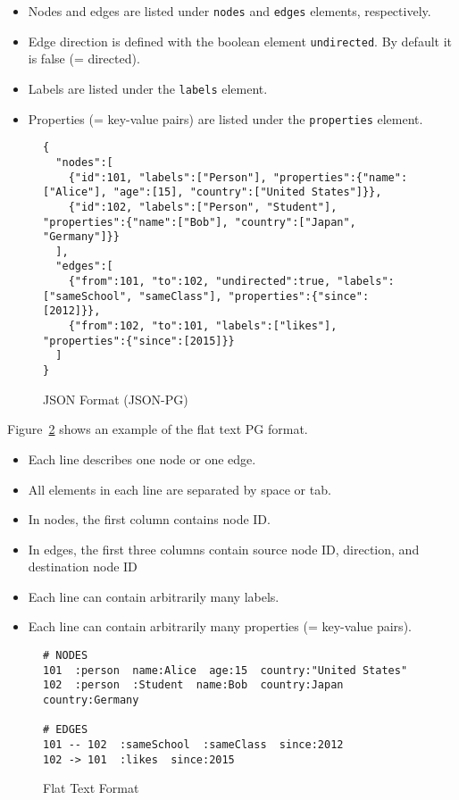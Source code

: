 \documentclass[runningheads]{llncs}
\begin{document}
\begin{itemize}
    \item Nodes and edges are listed under \texttt{nodes} and \texttt{edges} elements, respectively.
    \item Edge direction is defined with the boolean element \texttt{undirected}. By default it is false (= directed).
    \item Labels are listed under the \texttt{labels} element.
    \item Properties (= key-value pairs) are listed under the \texttt{properties} element.
\end{itemize}

\begin{figure}[!t]
\vspace{2mm}
\begin{scriptsize}
\begin{verbatim}
{
  "nodes":[
    {"id":101, "labels":["Person"], "properties":{"name":["Alice"], "age":[15], "country":["United States"]}},
    {"id":102, "labels":["Person", "Student"], "properties":{"name":["Bob"], "country":["Japan", "Germany"]}}
  ],
  "edges":[
    {"from":101, "to":102, "undirected":true, "labels":["sameSchool", "sameClass"], "properties":{"since":[2012]}},
    {"from":102, "to":101, "labels":["likes"], "properties":{"since":[2015]}}
  ]
}
\end{verbatim}
\end{scriptsize}
\caption{JSON Format (JSON-PG)}
\label{fig:format-json}
\end{figure}

Figure~\ref{fig:format-flat} shows an example of the flat text PG format.

\begin{itemize}
    \item Each line describes one node or one edge.
    \item All elements in each line are separated by space or tab.
    \item In nodes, the first column contains node ID.
    \item In edges, the first three columns contain source node ID, direction, and destination node ID
    \item Each line can contain arbitrarily many labels.
    \item Each line can contain arbitrarily many properties (= key-value pairs).
\end{itemize}

\begin{figure}[!t]
\vspace{2mm}
\begin{scriptsize}
\begin{verbatim}
# NODES
101  :person  name:Alice  age:15  country:"United States"
102  :person  :Student  name:Bob  country:Japan  country:Germany

# EDGES
101 -- 102  :sameSchool  :sameClass  since:2012
102 -> 101  :likes  since:2015
\end{verbatim}
\end{scriptsize}
\caption{Flat Text Format}
\label{fig:format-flat}
\end{figure}
\end{document}
